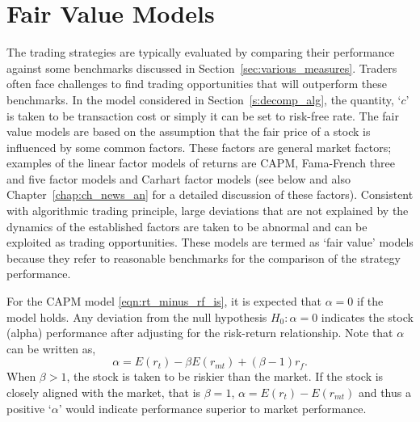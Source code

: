\section{Fair Value Models}


The trading strategies are typically evaluated by comparing their performance against some benchmarks discussed in Section~\ref{sec:various_measures}. Traders often face challenges to find trading opportunities that will outperform these benchmarks. In the model considered in Section~\ref{s:decomp_alg}, the quantity, `$c$' is taken to be transaction cost or simply it can be set to risk-free rate. The fair value models are based on the assumption that the fair price of a stock is influenced by some common factors. These factors are general market factors; examples of the linear factor models of returns are CAPM, Fama-French three and five factor models and Carhart factor models (see below and also Chapter~\ref{chap:ch_news_an} for a detailed discussion of these factors). Consistent with algorithmic trading principle, large deviations that are not explained by the dynamics of the established factors are taken to be abnormal and can be exploited as trading opportunities. These models are termed as `fair value' models because they refer to reasonable benchmarks for the comparison of the strategy performance.


For the CAPM model \eqref{eqn:rt_minus_rf_is}, it is expected that $\alpha= 0$ if the model holds. Any deviation from the null hypothesis $H_0: \alpha= 0$ indicates the stock (alpha) performance after adjusting for the risk-return relationship. Note that $\alpha$ can be written as,
	\begin{equation} \label{eqn:alpha_written}
	\alpha= E(r_t) - \beta E(r_{mt}) + (\beta -1) r_f.
	\end{equation}
When $\beta>1$, the stock is taken to be riskier than the market. If the stock is closely aligned with the market, that is $\beta=1$, $\alpha= E(r_t) - E(r_{mt})$ and thus a positive `$\alpha$' would indicate performance superior to market performance.


